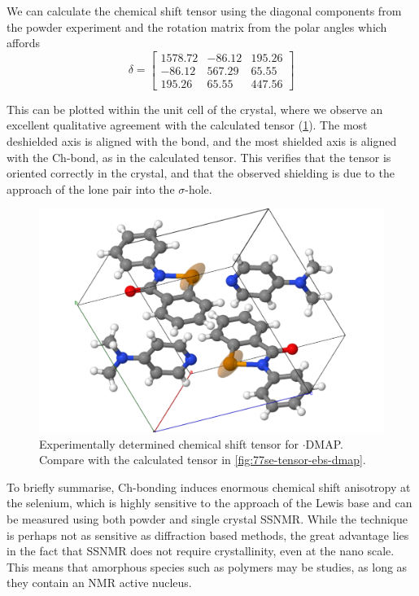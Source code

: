 \begin{refsection}
We can calculate the chemical shift tensor using the diagonal components from the powder experiment and the rotation matrix from the polar angles which affords
\begin{equation}
  \delta = \begin{bmatrix} 1578.72 & -86.12 & 195.26 \\ -86.12 & 567.29 & 65.55 \\ 195.26 & 65.55 & 447.56 \end{bmatrix}
\end{equation}

This can be plotted within the unit cell of the crystal, where we observe an excellent qualitative agreement with the calculated tensor (\cref{fig:expt-tensor-ebs-dmap}).
The most deshielded axis is aligned with the  bond, and the most shielded axis is aligned with the Ch-bond, as in the calculated tensor.
This verifies that the tensor is oriented correctly in the crystal, and that the observed shielding is due to the approach of the lone pair into the $\sigma$-hole.

\begin{figure}
  \centering
  \includegraphics[width=0.7\linewidth]{Figures/expt-tensor-ebs-dmap.pdf}
  \caption[Experimentally determined chemical shift tensor for $\cdot$DMAP.]{Experimentally determined chemical shift tensor for $\cdot$DMAP. Compare with the calculated tensor in \cref{fig:77se-tensor-ebs-dmap}.}
  \label{fig:expt-tensor-ebs-dmap}
\end{figure}

To briefly summarise, Ch-bonding induces enormous chemical shift anisotropy at the selenium, which is highly sensitive to the approach of the Lewis base and can be measured using both powder and single crystal SSNMR.
While the technique is perhaps not as sensitive as diffraction based methods, the great advantage lies in the fact that SSNMR does not require crystallinity, even at the nano scale.
This means that amorphous species such as polymers may be studies, as long as they contain an NMR active nucleus.


\end{refsection}
